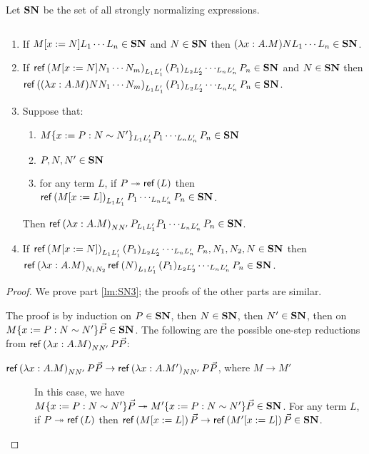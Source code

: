
Let $\mathbf{SN}$ be the set of all strongly normalizing expressions.

\begin{lemma}
\label{lm:SN}
$ $
\begin{enumerate}
\item
\label{lm:SN1}
If $M[x:=N]L_1 \cdots L_n \in \mathbf{SN}$ and $N \in \mathbf{SN}$ then $(\lambda x:A.M)NL_1 \cdots L_n \in \mathbf{SN}$.
\item
\label{lm:SN2}
If $\mathsf{ref} \left( {M[x:=N]N_1 \cdots N_m} \right)_{L_1 L_1'} (P_1)_{L_2 L_2'} \cdots_{L_n L_n'} P_n \in \mathbf{SN}$ and $N \in \mathbf{SN}$ then
$\mathsf{ref} \left( {(\lambda x:A.M)NN_1 \cdots N_m} \right)_{L_1 L_1'} (P_1)_{L_2 L_2'} \cdots_{L_n L_n'} P_n \in \mathbf{SN}$.
\item
\label{lm:SN3}
Suppose that:
\begin{enumerate}
\item
$M\{x:=P:N\sim N'\}_{L_1 L_1'} P_1 \cdots_{L_n L_n'} P_n \in \mathbf{SN}$
\item
$P, N, N' \in \mathbf{SN}$
\item
for any term $L$, if $P \twoheadrightarrow \mathsf{ref} \left( {L} \right)$
then $\mathsf{ref} \left( {M[x:=L]} \right)_{L_1 L_1'} P_1 \cdots_{L_n L_n'} P_n \in \mathbf{SN}$.
\end{enumerate}
Then $\mathsf{ref} \left( {\lambda x:A.M} \right)_{N N'} P_{L_1 L_1'} P_1 \cdots_{L_n L_n'} P_n \in \mathbf{SN}$.
\item
\label{lm:SN4}
If $\mathsf{ref} \left( {M[x:=N]} \right)_{L_1 L_1'} (P_1)_{L_2 L_2'} \cdots_{L_n L_n'} P_n, N_1, N_2, N \in \mathbf{SN}$ then \\
$\mathsf{ref} \left( {\lambda x:A.M} \right)_{N_1 N_2}\mathsf{ref} \left( {N} \right)_{L_1 L_1'} (P_1)_{L_2 L_2'} \cdots_{L_n L_n'} P_n \in \mathbf{SN}$.
\end{enumerate}
\end{lemma}

\begin{proof}
We prove part \ref{lm:SN3}; the proofs of the other parts are similar.

The proof is by induction on $P \in \mathbf{SN}$, then $N \in \mathbf{SN}$, then $N' \in \mathbf{SN}$,
then on $M\{x := P : N \sim N' \} \vec{P} \in \mathbf{SN}$.  The following are the possible one-step reductions from
$\mathsf{ref} \left( {\lambda x:A.M} \right)_{N N'} P \vec{P}$:

\begin{description}
\item[$\mathsf{ref} \left( {\lambda x:A.M} \right)_{N N'} P \vec{P} \rightarrow \mathsf{ref} \left( {\lambda x:A.M'} \right)_{N N'} P \vec{P}$, where $M \rightarrow M'$]
In this case, we have $M \{ x:=P : N \sim N' \} \vec{P} \twoheadrightarrow M' \{ x:=P : N \sim N' \} \vec{P} \in \mathbf{SN}$.
For any term $L$, if $P \twoheadrightarrow \mathsf{ref} \left( {L} \right)$ then $\mathsf{ref} \left( {M[x:=L]} \right) \vec{P} \rightarrow \mathsf{ref} \left( {M'[x:=L]} \right) \vec{P} \in \mathbf{SN}$.
\end{description}
\end{proof}

